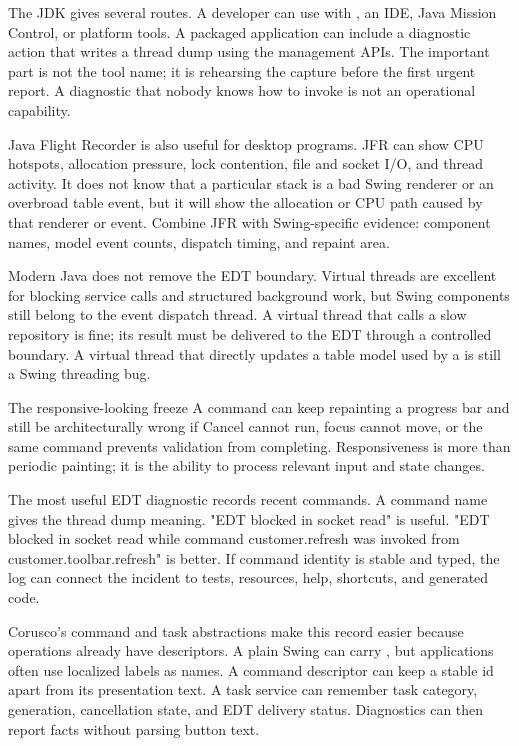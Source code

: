 The JDK gives several routes. A developer can use  with , an IDE, Java Mission Control, or platform tools. A packaged application can include a diagnostic action that writes a thread dump using the management APIs. The important part is not the tool name; it is rehearsing the capture before the first urgent report. A diagnostic that nobody knows how to invoke is not an operational capability.

Java Flight Recorder is also useful for desktop programs. JFR can show CPU hotspots, allocation pressure, lock contention, file and socket I/O, and thread activity. It does not know that a particular stack is a bad Swing renderer or an overbroad table event, but it will show the allocation or CPU path caused by that renderer or event. Combine JFR with Swing-specific evidence: component names, model event counts, dispatch timing, and repaint area.

Modern Java does not remove the EDT boundary. Virtual threads are excellent for blocking service calls and structured background work, but Swing components still belong to the event dispatch thread. A virtual thread that calls a slow repository is fine; its result must be delivered to the EDT through a controlled boundary. A virtual thread that directly updates a table model used by a  is still a Swing threading bug.

\begin{pitfallbox}{The responsive-looking freeze}
A command can keep repainting a progress bar and still be architecturally wrong if Cancel cannot run, focus cannot move, or the same command prevents validation from completing. Responsiveness is more than periodic painting; it is the ability to process relevant input and state changes.
\end{pitfallbox}

The most useful EDT diagnostic records recent commands. A command name gives the thread dump meaning. "EDT blocked in socket read" is useful. "EDT blocked in socket read while command customer.refresh was invoked from customer.toolbar.refresh" is better. If command identity is stable and typed, the log can connect the incident to tests, resources, help, shortcuts, and generated code.

Corusco's command and task abstractions make this record easier because operations already have descriptors. A plain Swing  can carry , but applications often use localized labels as names. A command descriptor can keep a stable id apart from its presentation text. A task service can remember task category, generation, cancellation state, and EDT delivery status. Diagnostics can then report facts without parsing button text.

